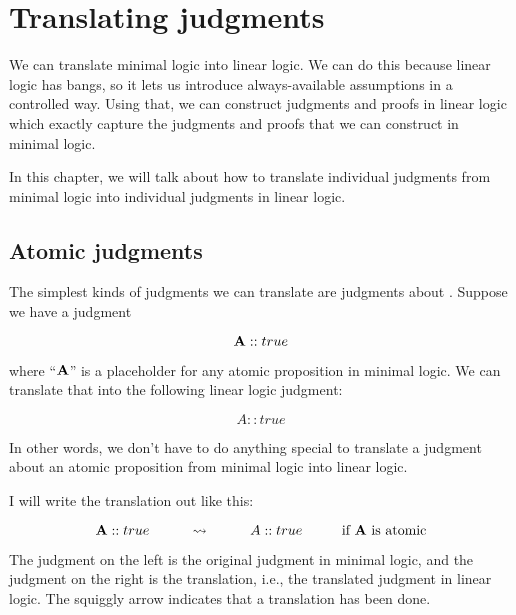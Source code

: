 \documentclass[../../../main.tex]{subfiles}
\begin{document}
\chapter{Translating judgments}

We can translate minimal logic into linear logic. We can do this because linear logic has bangs, so it lets us introduce always-available assumptions in a controlled way. Using that, we can construct judgments and proofs in linear logic which exactly capture the judgments and proofs that we can construct in minimal logic. 

In this chapter, we will talk about how to translate individual judgments from minimal logic into individual judgments in linear logic.


\section{Atomic judgments}

The simplest kinds of judgments we can translate are judgments about . Suppose we have a judgment

\begin{equation*}
  \mathbf{A} :: true
\end{equation*}

\noindent
where ``$\mathbf{A}$'' is a placeholder for any atomic proposition in minimal logic. We can translate that into the following linear logic judgment:

\begin{equation*}
  A :: true
\end{equation*}

\noindent
In other words, we don't have to do anything special to translate a judgment about an atomic proposition from minimal logic into linear logic. 

I will write the translation out like this:

\begin{equation*}
  \mathbf{A} :: true \hskip 1cm \rightsquigarrow \hskip 1cm A :: true \hskip 1cm \text{if $\mathbf{A}$ is atomic}
\end{equation*}

\noindent
The judgment on the left is the original judgment in minimal logic, and the judgment on the right is the translation, i.e., the translated judgment in linear logic. The squiggly arrow indicates that a translation has been done.
\end{document}
